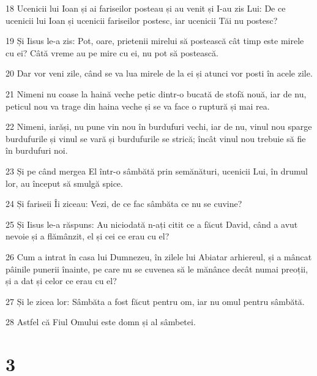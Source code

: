 \par 18 Ucenicii lui Ioan și ai fariseilor posteau și au venit și I-au zis Lui: De ce ucenicii lui Ioan și ucenicii fariseilor postesc, iar ucenicii Tăi nu postesc?
\par 19 Și Iisus le-a zis: Pot, oare, prietenii mirelui să postească cât timp este mirele cu ei? Câtă vreme au pe mire cu ei, nu pot să postească.
\par 20 Dar vor veni zile, când se va lua mirele de la ei și atunci vor posti în acele zile.
\par 21 Nimeni nu coase la haină veche petic dintr-o bucată de stofă nouă, iar de nu, peticul nou va trage din haina veche și se va face o ruptură și mai rea.
\par 22 Nimeni, iarăși, nu pune vin nou în burdufuri vechi, iar de nu, vinul nou sparge burdufurile și vinul se vară și burdufurile se strică; încât vinul nou trebuie să fie în burdufuri noi.
\par 23 Și pe când mergea El într-o sâmbătă prin semănături, ucenicii Lui, în drumul lor, au început să smulgă spice.
\par 24 Și fariseii Îi ziceau: Vezi, de ce fac sâmbăta ce nu se cuvine?
\par 25 Și Iisus le-a răspuns: Au niciodată n-ați citit ce a făcut David, când a avut nevoie și a flămânzit, el și cei ce erau cu el?
\par 26 Cum a intrat în casa lui Dumnezeu, în zilele lui Abiatar arhiereul, și a mâncat pâinile punerii înainte, pe care nu se cuvenea să le mănânce decât numai preoții, și a dat și celor ce erau cu el?
\par 27 Și le zicea lor: Sâmbăta a fost făcut pentru om, iar nu omul pentru sâmbătă.
\par 28 Astfel că Fiul Omului este domn și al sâmbetei.

\chapter{3}

